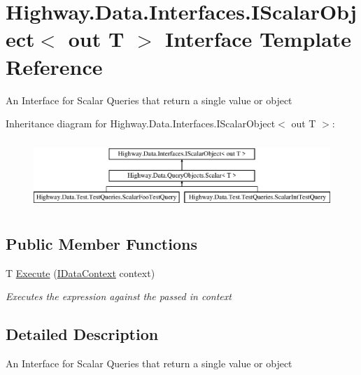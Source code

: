 \hypertarget{interface_highway_1_1_data_1_1_interfaces_1_1_i_scalar_object-g}{\section{Highway.\-Data.\-Interfaces.\-I\-Scalar\-Object$<$ out T $>$ Interface Template Reference}
\label{interface_highway_1_1_data_1_1_interfaces_1_1_i_scalar_object-g}
}


An Interface for Scalar Queries that return a single value or object  


Inheritance diagram for Highway.\-Data.\-Interfaces.\-I\-Scalar\-Object$<$ out T $>$\-:\begin{figure}[H]
\begin{center}
\leavevmode
\includegraphics[height=2.625000cm]{interface_highway_1_1_data_1_1_interfaces_1_1_i_scalar_object-g}
\end{center}
\end{figure}
\subsection*{Public Member Functions}
\begin{DoxyCompactItemize}
\item 
T \hyperlink{interface_highway_1_1_data_1_1_interfaces_1_1_i_scalar_object-g_afe687ef242a0e465c47e7feb104b0ce5}{Execute} (\hyperlink{interface_highway_1_1_data_1_1_interfaces_1_1_i_data_context}{I\-Data\-Context} context)
\begin{DoxyCompactList}\small\item\em Executes the expression against the passed in context \end{DoxyCompactList}\end{DoxyCompactItemize}


\subsection{Detailed Description}
An Interface for Scalar Queries that return a single value or object 


